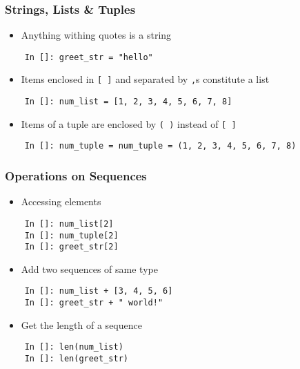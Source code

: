 \begin{frame}[fragile]
  \frametitle{Strings, Lists \& Tuples}
  \begin{itemize}
  \item Anything withing quotes is a string
  \end{itemize}
  \begin{lstlisting}
    In []: greet_str = "hello"
  \end{lstlisting}
  \begin{itemize}
  \item Items enclosed in \texttt{[ ]} and separated by \texttt{,}s
    constitute a list
  \end{itemize}
  \begin{lstlisting}
    In []: num_list = [1, 2, 3, 4, 5, 6, 7, 8]
  \end{lstlisting}
  \begin{itemize}
  \item Items of a tuple are enclosed by \texttt{( )} instead of
    \texttt{[ ]}  
  \end{itemize}
  \begin{lstlisting}
    In []: num_tuple = num_tuple = (1, 2, 3, 4, 5, 6, 7, 8)
  \end{lstlisting}
\end{frame}

\begin{frame}[fragile]
  \frametitle{Operations on Sequences}
  \begin{itemize}
  \item Accessing elements
  \end{itemize}
  \begin{lstlisting}
    In []: num_list[2] 
    In []: num_tuple[2]
    In []: greet_str[2]
  \end{lstlisting}
  \begin{itemize}
  \item Add two sequences of same type
  \end{itemize}
  \begin{lstlisting}
    In []: num_list + [3, 4, 5, 6]
    In []: greet_str + " world!"  
  \end{lstlisting}
  \begin{itemize}
  \item Get the length of a sequence
  \end{itemize}
  \begin{lstlisting}
    In []: len(num_list) 
    In []: len(greet_str)
  \end{lstlisting}
\end{frame}

